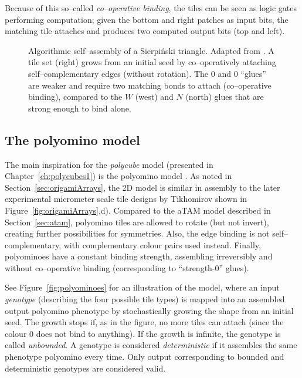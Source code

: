 Because of this so--called \emph{co--operative binding}, the tiles can be seen as logic gates performing computation; given the bottom and right patches as input bits, the matching tile attaches and produces two computed output bits (top and left).



\begin{figure}[h]
  \centering
  \caption{Algorithmic self--assembly of a Sierpiński triangle. Adapted from \cite{doty2017}. A tile set (right) grows from an initial seed by co--operatively attaching self--complementary edges (without rotation). The \(0\) and \(0\) ``glues'' are weaker and require two matching bonds to attach (co--operative binding), compared to the \(W\) (west) and \(N\) (north) glues that are strong enough to bind alone.}
  \label{fig:atam}
\end{figure}

\subsection{The polyomino model}\label{sec:polyomino}


The main inspiration for the \emph{polycube} model (presented in Chapter~\ref{ch:polycubes1}) is the polyomino model \cite{ahnert2010self, johnston2011evolutionary}. As noted in Section~\ref{sec:origamiArrays}, the 2D model is similar in assembly to the later experimental micrometer scale tile designs by Tikhomirov \cite{tikhomirov2017programmable} shown in Figure~\ref{fig:origamiArrays}.d). Compared to the aTAM model described in Section~\ref{sec:atam}, polyomino tiles are allowed to rotate (but not invert), creating further possibilities for symmetries. Also, the edge binding is not self--complementary, with complementary colour pairs used instead. Finally, polyominoes have a constant binding strength, assembling irreversibly and without co--operative binding (corresponding to ``strength-0'' glues).

See Figure~\ref{fig:polyominoes} for an illustration of the model, where an input \emph{genotype} (describing the four possible tile types) is mapped into an assembled output polyomino phenotype by stochastically growing the shape from an initial seed. The growth stops if, as in the figure, no more tiles can attach (since the colour \(0\) does not bind to anything). If the growth is infinite, the genotype is called \emph{unbounded}. A genotype is considered \emph{deterministic} if it assembles the same phenotype polyomino every time. Only output corresponding to bounded and deterministic genotypes are considered valid.


